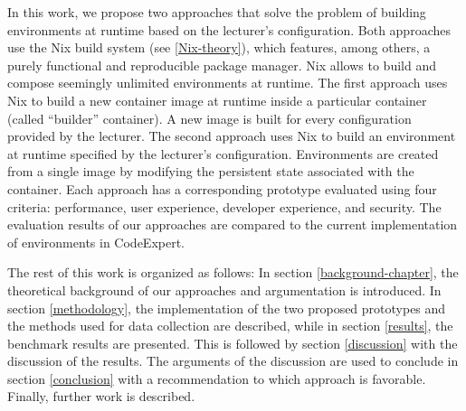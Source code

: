 In this work, we propose two approaches that solve the problem of building environments at runtime based on the lecturer's configuration. Both approaches use the Nix build system (see \ref{Nix-theory}), which features, among others, a purely functional and reproducible package manager. Nix allows to build and compose seemingly unlimited environments at runtime. The first approach uses Nix to build a new container image at runtime inside a particular container (called ``builder'' container). A new image is built for every configuration provided by the lecturer. The second approach uses Nix to build an environment at runtime specified by the lecturer's configuration. Environments are created from a single image by modifying the persistent state associated with the container. Each approach has a corresponding prototype evaluated using four criteria: performance, user experience, developer experience, and security. The evaluation results of our approaches are compared to the current implementation of environments in CodeExpert.

The rest of this work is organized as follows: In section \ref{background-chapter}, the theoretical background of our approaches and argumentation is introduced. In section \ref{methodology}, the implementation of the two proposed prototypes and the methods used for data collection are described, while in section \ref{results}, the benchmark results are presented. This is followed by section \ref{discussion} with the discussion of the results. The arguments of the discussion are used to conclude in section \ref{conclusion} with a recommendation to which approach is favorable. Finally, further work is described. 
